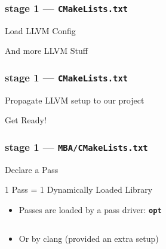 \documentclass[14pt]{beamer}
\begin{document}
    \begin{frame}[containsverbatim]
        \frametitle{stage 1 --- \texttt{CMakeLists.txt}}
        \begin{block}{Load LLVM Config}
            \footnotesize
            
        \end{block}
        \begin{block}{And more LLVM Stuff}
            \footnotesize
            
        \end{block}
    \end{frame}

    \begin{frame}[containsverbatim]
        \frametitle{stage 1 --- \texttt{CMakeLists.txt}}
        \begin{block}{Propagate LLVM setup to our project}
            \footnotesize
            
        \end{block}

        \begin{block}{Get Ready!}
            \footnotesize
            
        \end{block}
    \end{frame}

    \begin{frame}[containsverbatim]
        \frametitle{stage 1 --- \texttt{MBA/CMakeLists.txt}}
        \begin{block}{Declare a Pass}
            \footnotesize
            
        \end{block}

        \begin{alertblock}{1 Pass = 1 Dynamically Loaded Library}
            \begin{itemize}
                \item Passes are loaded by a pass driver: \textbf{\texttt{opt}}
{
\footnotesize
\begin{lstlisting}[language=bash]
% opt -load LLVMMBA.so -mba foo.ll -S
\end{lstlisting}
}
                \item Or by clang (provided an extra setup)
{
\footnotesize
\begin{lstlisting}[language=bash]
% clang -Xclang -load -Xclang LLVMMBA.so foo.c -c
\end{lstlisting}
}
            \end{itemize}
        \end{alertblock}

    \end{frame}
\end{document}
